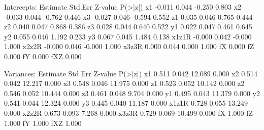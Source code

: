 \begin{Schunk}
\begin{Soutput}
Intercepts:
                   Estimate  Std.Err  Z-value  P(>|z|)
    x1               -0.011    0.044   -0.250    0.803
    x2               -0.033    0.044   -0.762    0.446
    x3               -0.027    0.046   -0.594    0.552
    z1                0.035    0.046    0.765    0.444
    z2                0.040    0.047    0.868    0.386
    z3                0.028    0.044    0.640    0.522
    y1                0.022    0.047    0.461    0.645
    y2                0.055    0.046    1.192    0.233
    y3                0.067    0.045    1.484    0.138
    x1z1R            -0.000    0.042   -0.000    1.000
    x2z2R            -0.000    0.046   -0.000    1.000
    x3z3R             0.000    0.044    0.000    1.000
    fX                0.000                           
    fZ                0.000                           
    fY                0.000                           
    fXZ               0.000                           

Variances:
                   Estimate  Std.Err  Z-value  P(>|z|)
    x1                0.511    0.042   12.089    0.000
    x2                0.514    0.042   12.217    0.000
    x3                0.548    0.046   11.975    0.000
    z1                0.523    0.052   10.142    0.000
    z2                0.546    0.052   10.444    0.000
    z3                0.461    0.048    9.704    0.000
    y1                0.495    0.043   11.379    0.000
    y2                0.541    0.044   12.324    0.000
    y3                0.445    0.040   11.187    0.000
    x1z1R             0.728    0.055   13.249    0.000
    x2z2R             0.673    0.093    7.268    0.000
    x3z3R             0.729    0.069   10.499    0.000
    fX                1.000                           
    fZ                1.000                           
    fY                1.000                           
    fXZ               1.000                           
\end{Soutput}
\end{Schunk}
